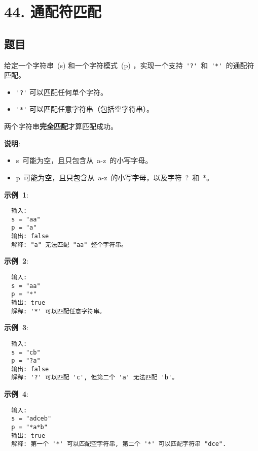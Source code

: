 \newpage
\section{44. 通配符匹配}
\label{leetcode:44}

\subsection{题目}

给定一个字符串 (s) 和一个字符模式 (p) ，实现一个支持 \verb|'?'| 和 \verb|'*'| 的通配符匹配。

\begin{itemize}
  \item \verb|'?'| 可以匹配任何单个字符。
  \item \verb|'*'| 可以匹配任意字符串（包括空字符串）。
\end{itemize}

两个字符串\textbf{完全匹配}才算匹配成功。

\textbf{说明}:

\begin{itemize}
  \item s 可能为空，且只包含从 a-z 的小写字母。
  \item p 可能为空，且只包含从 a-z 的小写字母，以及字符 ? 和 *。
\end{itemize}

\textbf{示例 1}:

\begin{verbatim}
  输入:
  s = "aa"
  p = "a"
  输出: false
  解释: "a" 无法匹配 "aa" 整个字符串。
\end{verbatim}

\textbf{示例 2}:

\begin{verbatim}
  输入:
  s = "aa"
  p = "*"
  输出: true
  解释: '*' 可以匹配任意字符串。
\end{verbatim}

\textbf{示例 3}:

\begin{verbatim}
  输入:
  s = "cb"
  p = "?a"
  输出: false
  解释: '?' 可以匹配 'c', 但第二个 'a' 无法匹配 'b'。
\end{verbatim}

\textbf{示例 4}:

\begin{verbatim}
  输入:
  s = "adceb"
  p = "*a*b"
  输出: true
  解释: 第一个 '*' 可以匹配空字符串, 第二个 '*' 可以匹配字符串 "dce".
\end{verbatim}

